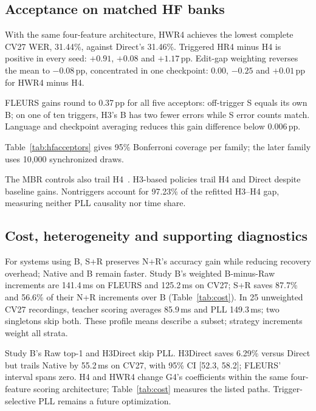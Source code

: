 \subsection{Acceptance on matched HF banks}

With the same four-feature architecture, HWR4 achieves the lowest complete CV27 WER, 31.44\%, against Direct's 31.46\%. Triggered HR4 minus H4 is positive in every seed: $+0.91$, $+0.08$ and $+1.17$\,pp. Edit-gap weighting reverses the mean to $-0.08$\,pp, concentrated in one checkpoint: $0.00$, $-0.25$ and $+0.01$\,pp for HWR4 minus H4.

FLEURS gains round to 0.37\,pp for all five acceptors: off-trigger S equals its own B; on one of ten triggers, H3's B has two fewer errors while S error counts match. Language and checkpoint averaging reduces this gain difference below 0.006\,pp.

\begin{samepage}
Table~\ref{tab:hfacceptors} gives 95\% Bonferroni coverage per family; the later family uses 10,000 synchronized draws.\par
\end{samepage}

The MBR controls also trail H4~\cite{jinnai2025mbrasr}. H3-based policies trail H4 and Direct despite baseline gains. Nontriggers account for 97.23\% of the refitted H3--H4 gap, measuring neither PLL causality nor time share.

\subsection{Cost, heterogeneity and supporting diagnostics}

For systems using B, S+R preserves N+R's accuracy gain while reducing recovery overhead; Native and B remain faster. Study B's weighted B-minus-Raw increments are 141.4\,ms on FLEURS and 125.2\,ms on CV27; S+R saves 87.7\% and 56.6\% of their N+R increments over B (Table~\ref{tab:cost}). In 25 unweighted CV27 recordings, teacher scoring averages 85.9\,ms and PLL 149.3\,ms; two singletons skip both. These profile means describe a subset; strategy increments weight all strata.

Study B's Raw top-1 and H3Direct skip PLL. H3Direct saves 6.29\% versus Direct but trails Native by 55.2\,ms on CV27, with 95\% CI [52.3, 58.2]; FLEURS' interval spans zero. H4 and HWR4 change G4's coefficients within the same four-feature scoring architecture; Table~\ref{tab:cost} measures the listed paths. Trigger-selective PLL remains a future optimization.

